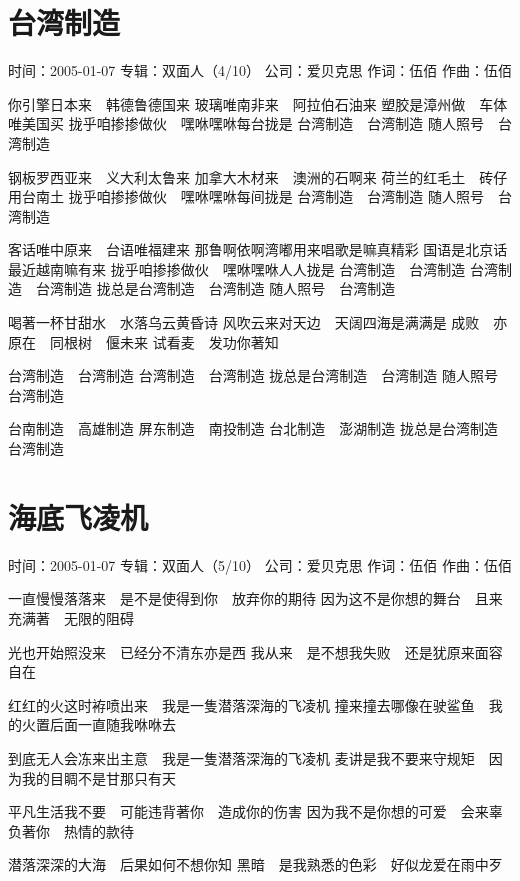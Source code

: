 \documentclass[UTF8,a4paper,oneside,twocolumn,12pt]{ctexbook}
\newcommand{\infopair}[2]{\textbullet #1：#2}
\newcommand{\zc}[1][伍佰]{\infopair{作词}{#1}}
\newcommand{\zq}[1][伍佰]{\infopair{作曲}{#1}}
\newcommand{\zj}[1]{\infopair{专辑}{#1}}
\newcommand{\sj}[1]{\infopair{时间}{#1}}
\newcommand{\gs}[1]{\infopair{公司}{#1}}
\newenvironment{info}{\begin{flushleft}\kaishu
	}
	{\end{flushleft}\normalsize\yahei\par}
\newenvironment{lyric}{
	}
{}
\begin{document}
\section{台湾制造}
\begin{info}
	\sj{2005-01-07}
	\zj{双面人（4/10）}
	\gs{爱贝克思}
	\zc
	\zq
\end{info}
\begin{lyric}
	你引擎日本来　韩德鲁德国来
	玻璃唯南非来　阿拉伯石油来
	塑胶是漳州做　车体唯美国买
	拢乎咱掺掺做伙　嘿咻嘿咻每台拢是
	台湾制造　台湾制造
	随人照号　台湾制造

	钢板罗西亚来　义大利太鲁来
	加拿大木材来　澳洲的石啊来
	荷兰的红毛土　砖仔用台南土
	拢乎咱掺掺做伙　嘿咻嘿咻每间拢是
	台湾制造　台湾制造
	随人照号　台湾制造

	客话唯中原来　台语唯福建来
	那鲁啊依啊湾嘟用来唱歌是嘛真精彩
	国语是北京话　最近越南嘛有来
	拢乎咱掺掺做伙　嘿咻嘿咻人人拢是
	台湾制造　台湾制造
	台湾制造　台湾制造
	拢总是台湾制造　台湾制造
	随人照号　台湾制造

	喝著一杯甘甜水　水落乌云黄昏诗
	风吹云来对天边　天阔四海是满满是
	成败　亦原在　同根树　偃未来
	试看麦　发功你著知

	台湾制造　台湾制造
	台湾制造　台湾制造
	拢总是台湾制造　台湾制造
	随人照号　台湾制造

	台南制造　高雄制造
	屏东制造　南投制造
	台北制造　澎湖制造
	拢总是台湾制造　台湾制造
\end{lyric}

\section{海底飞凌机}
\begin{info}
	\sj{2005-01-07}
	\zj{双面人（5/10）}
	\gs{爱贝克思}
	\zc
	\zq
\end{info}
\begin{lyric}
	一直慢慢落落来　是不是使得到你　放弃你的期待
	因为这不是你想的舞台　且来充满著　无限的阻碍

	光也开始照没来　已经分不清东亦是西
	我从来　是不想我失败　还是犹原来面容自在

	红红的火这时袸喷出来　我是一隻潜落深海的飞凌机
	撞来撞去哪像在驶鲨鱼　我的火置后面一直随我咻咻去

	到底无人会冻来出主意　我是一隻潜落深海的飞凌机
	麦讲是我不要来守规矩　因为我的目睭不是甘那只有天

	平凡生活我不要　可能违背著你　造成你的伤害
	因为我不是你想的可爱　会来辜负著你　热情的款待

	潜落深深的大海　后果如何不想你知
	黑暗　是我熟悉的色彩　好似龙爱在雨中歹
\end{lyric}
\end{document}
